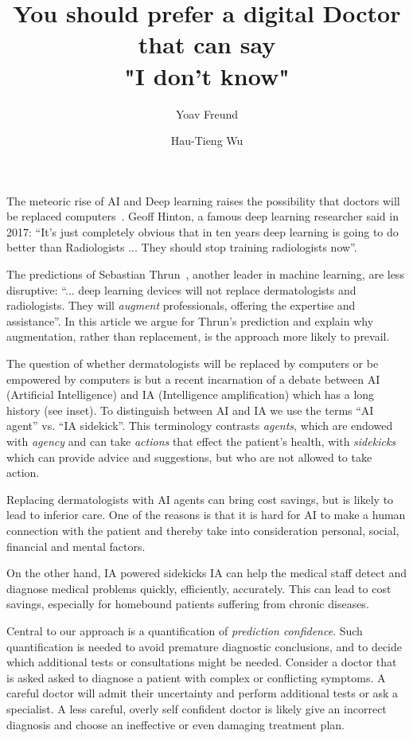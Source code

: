 \documentclass[11pt]{pnas-new}
\author[1]{Yoav Freund}
\author[2]{Hau-Tieng Wu}
\affil[1]{UCSD, Computer Science, San Diego, 92093, United States}
\affil[2]{Duke, Mathematics and Statistical Science, Durham, 27708, USA}
\title{You should prefer a digital Doctor that can say\\ "I don't know"}
\newlength{\strutheight}
\begin{document}
\settoheight{\strutheight}{\strut}

 
\maketitle


The meteoric rise of AI and Deep learning raises the possibility that
doctors will be replaced computers~\cite{Mukherjee2017}. Geoff Hinton,
a famous deep learning researcher said in 2017: ``It's just completely
obvious that in ten years deep learning is going to do better than
Radiologists ... They should stop training radiologists now''.

The predictions of Sebastian
Thrun~\cite{Mukherjee2017,esteva2017dermatologist}, another leader in
machine learning, are less disruptive: ``... deep learning devices
will not replace dermatologists and radiologists. They will {\em
  augment} professionals, offering the expertise and assistance''. In
this article we argue for Thrun's prediction and explain why
augmentation, rather than replacement, is the approach more likely to
prevail.

 The question of whether dermatologists will be
replaced by computers or be empowered by computers is but a recent
incarnation of a debate between AI (Artificial Intelligence) and IA
(Intelligence amplification) which has a long history (see inset). To
distinguish between AI and IA we use the terms ``AI agent'' vs. ``IA
sidekick''. This terminology contrasts {\em agents}, which are endowed
with {\em agency} and can take {\em actions} that effect the patient's
health, with {\em sidekicks} which can provide advice and suggestions,
but who are not allowed to take action.

Replacing dermatologists with AI agents can bring cost savings,
but is likely to lead to inferior care. One of the reasons is that it
is hard for AI to make a human connection with the patient and thereby
take into consideration personal, social, financial and mental factors.

On the other hand, IA powered sidekicks IA can help the medical staff
detect and diagnose medical problems quickly, efficiently,
accurately. This can lead to cost savings, especially for homebound
patients suffering from chronic diseases.

Central to our approach is a quantification of {\em prediction
  confidence}. Such quantification is needed to avoid premature
diagnostic conclusions, and to decide which additional tests or
consultations might be needed. Consider a doctor that is asked asked
to diagnose a patient with complex or conflicting symptoms. A careful
doctor will admit their uncertainty and perform additional tests or
ask a specialist. A less careful, overly self confident doctor is
likely give an incorrect diagnosis and choose an ineffective or even damaging
treatment plan.
\end{document}
